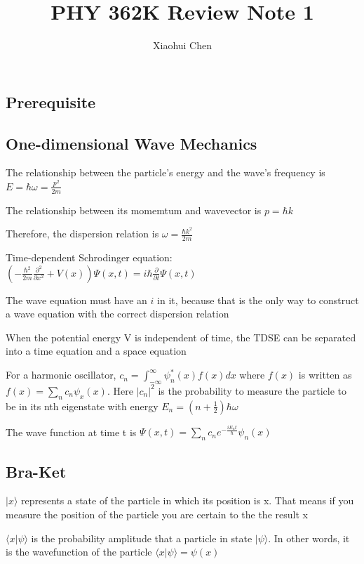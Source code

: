 \documentclass[12pt]{article}
\author{Xiaohui Chen}
\title{PHY 362K Review Note 1}
\begin{document}
\maketitle
\begin{spacing}{2.0}

\section{Prerequisite}

\subsection{One-dimensional Wave Mechanics}

The relationship between the particle's energy and the wave's frequency is $E=\hbar \omega =\frac{p^2}{2m}$

The relationship between its momemtum and wavevector is $p=\hbar k$

Therefore, the dispersion relation is $\omega= \frac{\hbar k^2}{2m}$

Time-dependent Schrodinger equation: $\left( -\frac{\hbar^2}{2m} \frac{\partial^2}{\partial x^2} + V(x) \right)\Psi(x,t)= i\hbar \frac{\partial}{\partial t} \Psi(x,t)$

The wave equation must have an $i$ in it, because that is the only way to construct a wave equation with the correct dispersion relation

When the potential energy V is independent of time, the TDSE can be separated into a time equation and a space equation

For a harmonic oscillator, $c_n=\int_{-\infty}^{\infty} \psi^{*}_n(x) f(x) dx$ where $f(x)$ is written as $f(x)=\sum_{n} c_n\psi_x(x)$. Here $|c_n|^2$ is the probability to measure the particle to be in its nth eigenstate with energy $E_n= \left( n+\frac{1}{2} \right) \hbar \omega$

The wave function at time t is $\Psi(x,t)= \sum_n c_n e^{-\frac{iE_n t}{\hbar}} \psi_n(x)$

\subsection{Bra-Ket}

$|x\rangle$ represents a state of the particle in which its position is x. That means if you measure the position of the particle you are certain to the the result x

$\langle x|\psi \rangle$ is the probability amplitude that a particle in state $|\psi\rangle$. In other words, it is the wavefunction of the particle $\langle x|\psi \rangle = \psi(x)$


\end{spacing}
\end{document}

